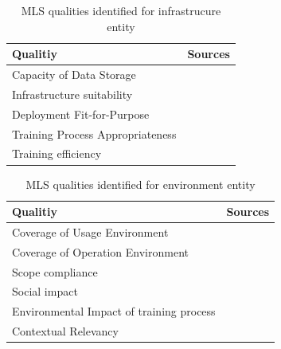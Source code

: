 \begin{table}[h]\label{tb:LiteratureQualitiesInfrastructure}
    \centering\footnotesize
    \begin{tabular}{p{} p{}}
        \textbf{Qualitiy} & \textbf{Sources} \\
        \toprule
        Capacity of Data Storage &~\cite{nakamichi_requirements-driven_2020} \\
        Infrastructure suitability &~\cite{siebert_construction_2021} \\
        Deployment Fit-for-Purpose &~\cite{ashmore_assuring_2021} \\
        Training Process Appropriateness &~\cite{nakamichi_requirements-driven_2020} \\
        Training efficiency &~\cite{siebert_construction_2021} \\
    \end{tabular}
    \caption{MLS qualities identified for infrastrucure entity}
\end{table}

\begin{table}[h]\label{tb:LiteratureQualitiesEnvironment}
    \centering\footnotesize
    \begin{tabular}{p{} p{}}
        \textbf{Qualitiy} & \textbf{Sources} \\
        \toprule
        Coverage of Usage Environment &~\cite{nakamichi_requirements-driven_2020} \\
        Coverage of Operation Environment &~\cite{nakamichi_requirements-driven_2020} \\
        Scope compliance &~\cite{siebert_construction_2021} \\
        Social impact &~\cite{siebert_construction_2021} \\
        Environmental Impact of training process &~\cite{siebert_construction_2021}\\
        Contextual Relevancy &~\cite{ashmore_assuring_2021} \\
    \end{tabular}
    \caption{MLS qualities identified for environment entity}
\end{table}

